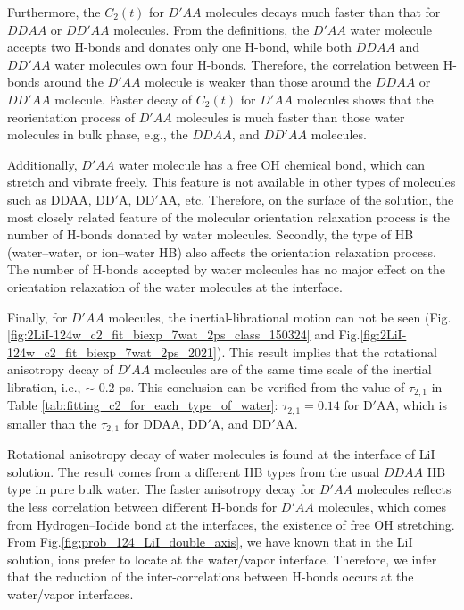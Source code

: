 Furthermore, the $C_2(t)$ for $D'AA$ molecules decays much faster than that for $DDAA$ or $DD'AA$ molecules.
From the definitions, the $D'AA$ water molecule accepts two H-bonds and donates only one H-bond, 
while both $DDAA$ and $DD'AA$ water molecules own four H-bonds.
Therefore, the correlation between H-bonds around the $D'AA$ molecule is weaker than those around the $DDAA$ or $DD'AA$ molecule. 
Faster decay of $C_2(t)$ for $D'AA$ molecules shows that the reorientation process of $D'AA$
molecules is much faster than those water molecules in bulk phase, e.g., the $DDAA$, and $DD'AA$ molecules.

Additionally, $D'AA$ water molecule has a free OH chemical bond, which can stretch and vibrate freely. 
This feature is not available in other types of molecules such as DDAA, DD$'$A, DD$'$AA, etc. 
Therefore, on the surface of the solution, the most closely related feature of the molecular orientation relaxation process is 
the number of H-bonds donated by water molecules. Secondly, the type of HB (water--water, or ion--water HB) 
also affects the orientation relaxation process. The number of H-bonds accepted by water molecules has no major effect on the orientation relaxation 
of the water molecules at the interface.

Finally, for $D'AA$ molecules, the inertial-librational motion can not be seen (Fig.\thinspace\ref{fig:2LiI-124w_c2_fit_biexp_7wat_2ps_class_150324} 
and Fig.\thinspace\ref{fig:2LiI-124w_c2_fit_biexp_7wat_2ps_2021}). 
This result implies that the rotational anisotropy decay of $D'AA$ molecules
are of the same time scale of the inertial libration, i.e., $\sim$ 0.2 ps. 
This conclusion can be verified from the value of $\tau_{2,1}$ in Table \ref{tab:fitting_c2_for_each_type_of_water}: $\tau_{2,1}=0.14$ for D$'$AA, 
which is smaller than the $\tau_{2,1}$ for DDAA, DD$'$A, and DD$'$AA.

Rotational anisotropy decay of water molecules is found at the interface of LiI solution. 
The result comes from a different HB types from the usual $DDAA$ HB type in pure bulk water.
The faster anisotropy decay for $D'AA$ molecules reflects the less correlation between different H-bonds for $D'AA$ molecules, 
which comes from Hydrogen--Iodide bond at the interfaces, the existence of free OH stretching.
From Fig.\space\ref{fig:prob_124_LiI_double_axis}, we have known that in the LiI solution, 
\I ions prefer to locate at the water/vapor interface.  
Therefore, we infer that the reduction of the inter-correlations between H-bonds occurs at the water/vapor interfaces. 


